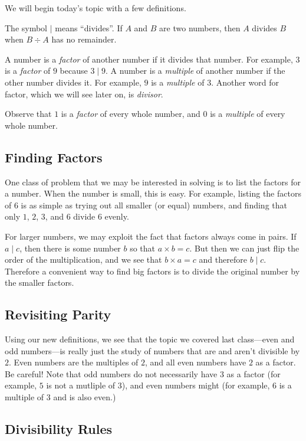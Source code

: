 \documentclass[a4paper,10pt]{report}
\begin{document}
We will begin today's topic with a few definitions.

The symbol \(\mid\) means ``divides''. If \(A\) and \(B\) are two numbers, then
\(A\) divides \(B\) when \(B \div A\) has no remainder.

A number is a \emph{factor} of another number if it divides that number. For
example, \(3\) is a \emph{factor} of \(9\) because \(3 \mid 9\). A number is a
\emph{multiple} of another number if the other number divides it. For example,
\(9\) is a \emph{multiple} of \(3\). Another word for factor, which we will see
later on, is \emph{divisor}.

Observe that \(1\) is a \emph{factor} of every whole number, and \(0\) is a
\emph{multiple} of every whole number.

\subsection{Finding Factors}

One class of problem that we may be interested in solving is to list the
factors for a number. When the number is small, this is easy. For example,
listing the factors of \(6\) is as simple as trying out all smaller (or equal)
numbers, and finding that only \(1\), \(2\), \(3\), and \(6\) divide \(6\)
evenly.

For larger numbers, we may exploit the fact that factors always come in pairs.
If \(a \mid c\), then there is some number \(b\) so that \(a \times b = c\).
But then we can just flip the order of the multiplication, and we see that \(b
\times a = c\) and therefore \(b \mid c\). Therefore a convenient way to find
big factors is to divide the original number by the smaller factors.

\subsection{Revisiting Parity}

Using our new definitions, we see that the topic we covered last class---even
and odd numbers---is really just the study of numbers that are and aren't
divisible by \(2\). Even numbers are the multiples of \(2\), and all even
numbers have \(2\) as a factor. Be careful! Note that odd numbers do not
necessarily have \(3\) as a factor (for example, \(5\) is not a mutliple of
\(3\)), and even numbers might (for example, \(6\) is a multiple of \(3\) and
is also even.)

\subsection{Divisibility Rules}
\end{document}
